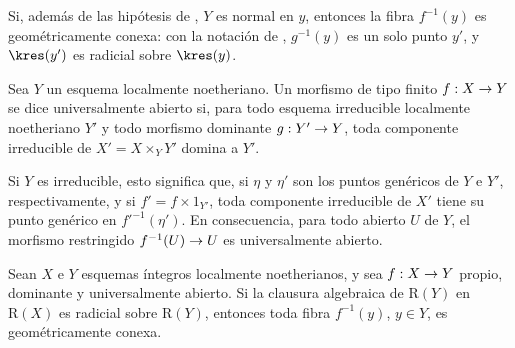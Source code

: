\documentclass[oneside]{amsart}
\makeatletter
\newcommand{\ega@arrow}[2]{\mathchoice{#1}{#2}{#2}{#2}}
\renewcommand{\to}{\ega@arrow{\longrightarrow}{\rightarrow}}
\let\EGAOriginalLabel\label
\renewcommand{\label}[1]{\phantomsection\EGAOriginalLabel{#1}}
\makeatother
\begin{document}
\begin{remark}[4.3.8]
\label{III.4.3.8}
Si, además de las hipótesis de , $Y$ es normal en
$y$, entonces la fibra $f^{-1}(y)$ es geométricamente conexa: con la
notación de , $g^{-1}(y)$ es un solo punto $y'$, y
$\kres(y')$ es radicial sobre $\kres(y)$.
\end{remark}

\begin{definition}[4.3.9]
\label{III.4.3.9}
Sea $Y$ un esquema localmente noetheriano. Un morfismo \textup{de tipo finito}
$f:X\to Y$ se dice universalmente abierto si, para todo esquema
irreducible localmente noetheriano $Y'$ y todo morfismo dominante
$g:Y'\to Y$, toda componente irreducible de
$X'=X\times_Y Y'$ domina a $Y'$.
\end{definition}

Si $Y$ es irreducible, esto significa que, si $\eta$ y $\eta'$ son
los puntos genéricos de $Y$ e $Y'$, respectivamente, y si
$f'=f\times 1_{Y'}$, toda componente irreducible de $X'$ tiene su
punto genérico en $f'^{-1}(\eta')$. En consecuencia, para todo
abierto $U$ de $Y$, el morfismo restringido $f^{-1}(U)\to U$ es
universalmente abierto.

\begin{corollary}[4.3.10]
\label{III.4.3.10}
Sean $X$ e $Y$ esquemas íntegros localmente noetherianos, y sea
$f:X\to Y$ propio, dominante y universalmente abierto. Si la clausura
algebraica de $\mathrm{R}(Y)$ en $\mathrm{R}(X)$ es radicial sobre
$\mathrm{R}(Y)$, entonces toda fibra $f^{-1}(y)$, $y\in Y$, es
geométricamente conexa.
\end{corollary}
\end{document}
